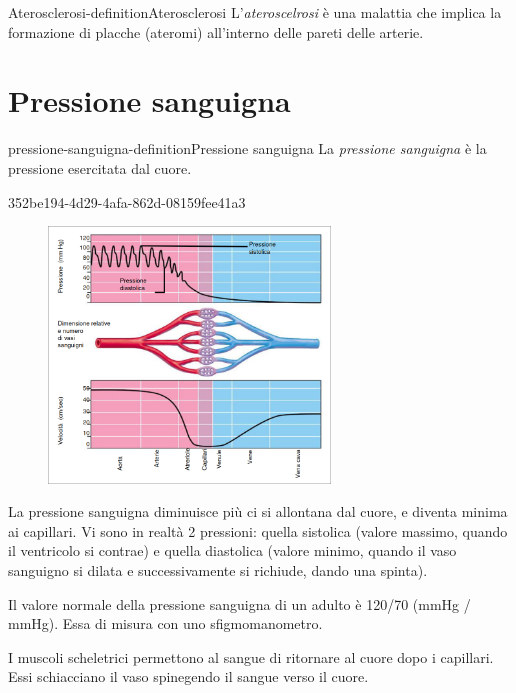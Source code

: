 \documentclass[preview]{standalone}
\begin{document}
\begin{snippetdefinition}{Aterosclerosi-definition}{Aterosclerosi}
    L'\textit{ateroscelrosi} è una malattia che implica la formazione di placche (ateromi) all'interno delle pareti delle arterie.
\end{snippetdefinition}


\section{Pressione sanguigna}

\begin{snippetdefinition}{pressione-sanguigna-definition}{Pressione sanguigna}
    La \textit{pressione sanguigna} è la pressione esercitata dal cuore.
\end{snippetdefinition}

\begin{snippet}{352be194-4d29-4afa-862d-08159fee41a3}
    \setlength{\intextsep}{0pt}%
    \begin{figure}
        \includegraphics[width=7.5cm]{./resources/pressione.png}
        \vspace{-1cm}
    \end{figure}
    
    La pressione sanguigna diminuisce più ci si allontana dal cuore, e diventa minima ai capillari.
    Vi sono in realtà 2 pressioni:
    quella sistolica (valore massimo, quando il ventricolo si contrae) e quella diastolica
    (valore minimo, quando il vaso sanguigno si dilata e successivamente si richiude, dando una spinta).
    
    Il valore normale della pressione sanguigna di un adulto è 120/70 (mmHg / mmHg).
    Essa di misura con uno sfigmomanometro.
    
    I muscoli scheletrici permettono al sangue di ritornare al cuore dopo i capillari.
    Essi schiacciano il vaso spinegendo il sangue verso il cuore.
    \wrapfill
\end{snippet}
\end{document}
